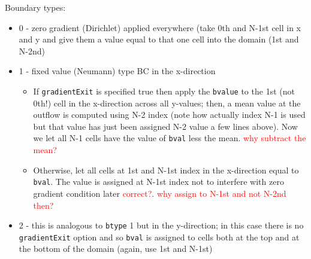 \documentclass[notitlepage]{article}
\begin{document}
Boundary types:
\begin{itemize}
\item 0 - zero gradient (Dirichlet) applied everywhere (take 0th and N-1st cell in x and y
	and give them a value equal to that one cell into the domain (1st and N-2nd)
\item 1 - fixed value (Neumann) type BC in the x-direction
	\begin{itemize}
	\item If \texttt{gradientExit} is specified true then apply the \texttt{bvalue}
		to the 1st (not 0th!) cell in the x-direction across all y-values;
		then, a mean value at the outflow is computed using N-2 index (note how actually
		index N-1 is used but that value has just been assigned N-2 value a few lines above).
		Now we let all N-1 cells have the value of \texttt{bval} less the mean.
		\textcolor{red}{why subtract the mean?}
	\item Otherwise, let all cells at 1st and N-1st index in the x-direction equal
		to \texttt{bval}. The value is assigned at N-1st index not to interfere with
		zero gradient condition later \textcolor{red}{correct?}.
		\textcolor{red}{why assign to N-1st and not N-2nd then?}
	\end{itemize}
\item 2 - this is analogous to \texttt{btype} 1 but in the y-direction; in this case
	there is no \texttt{gradientExit} option and so \texttt{bval} is assigned to cells
	both at the top and at the bottom of the domain (again, use 1st and N-1st)
\end{itemize}
\end{document}
